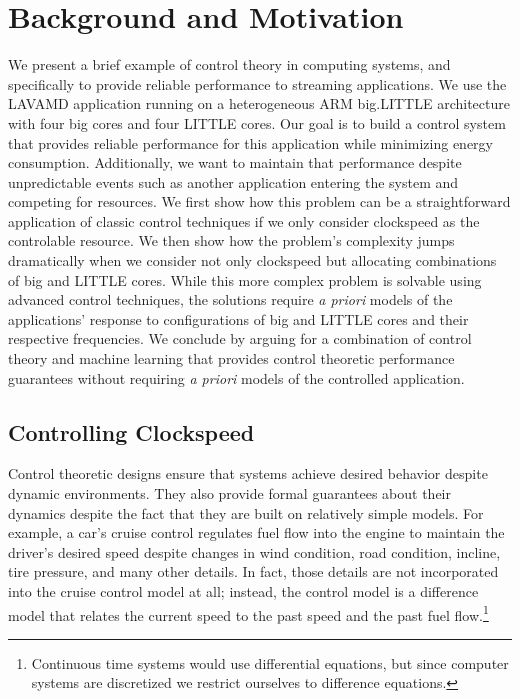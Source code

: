 \section{Background and Motivation}
\label{sec:example}
We present a brief example of control theory in computing systems, and
specifically to provide reliable performance to streaming applications.
We use the LAVAMD application running on a heterogeneous ARM
big.LITTLE architecture with four big cores and four LITTLE cores.
Our goal is to build a control system that provides reliable
performance for this application while minimizing energy consumption.
Additionally, we want to maintain that performance despite
unpredictable events such as another application entering the system
and competing for resources.  We first show how this problem can be a
straightforward application of classic control techniques if we only
consider clockspeed as the controlable resource.  We then show how the
problem's complexity jumps dramatically when we consider not only
clockspeed but allocating combinations of big and LITTLE cores.  While
this more complex problem is solvable using advanced control
techniques, the solutions require {\em a priori} models of the
applications' response to configurations of big and LITTLE cores and
their respective frequencies.  We conclude by arguing for a
combination of control theory and machine learning that provides
control theoretic performance guarantees without requiring {\em a
  priori} models of the controlled application.

\subsection{Controlling Clockspeed}
Control theoretic designs ensure that systems achieve desired behavior
despite dynamic environments.  They also provide formal guarantees
about their dynamics despite the fact that they are built on
relatively simple models.  For example, a car's cruise control
regulates fuel flow into the engine to maintain the driver's desired
speed despite changes in wind condition, road condition, incline, tire
pressure, and many other details.  In fact, those details are not
incorporated into the cruise control model at all; instead, the
control model is a difference model that relates the current speed to
the past speed and the past fuel flow.\footnote{Continuous time
  systems would use differential equations, but since computer systems
  are discretized we restrict ourselves to difference equations.}

